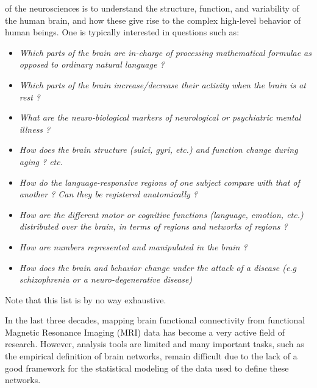  of the neurosciences is to understand the structure, function, and variability of the human brain, and how these give rise to the complex high-level behavior of human beings. One is typically interested in questions such as:

\begin{itemize}
  \item \textit{Which parts of the brain are in-charge of processing mathematical formulae as opposed to ordinary natural language ?}
  \item \textit{Which parts of the brain increase/decrease their activity when the brain is at rest ?}
  \item \textit{What are the neuro-biological markers of neurological or psychiatric mental illness ?}
  \item \textit{How does the brain structure (sulci, gyri, etc.) and function change during aging ? etc.}
 \item \textit{How do the language-responsive regions of one subject compare with that of another ? Can they be registered anatomically ?}
 \item \textit{How are the different motor or cognitive functions (language, emotion, etc.) distributed over the brain, in terms of regions and networks of regions ?}
 \item \textit{How are numbers represented and manipulated in the brain ?}
\item \textit{How does the brain and behavior change under the attack of a disease (e.g schizophrenia or a neuro-degenerative disease)}   
\end{itemize}
Note that this list is by no way exhaustive.

In the last three decades, mapping brain functional connectivity from
functional Magnetic Resonance Imaging (MRI) data has become a very
active field of research. However, analysis tools are limited and many
important tasks, such as the empirical definition of brain networks,
remain difficult due to the lack of a good framework for the
statistical modeling of the data used to define these networks.
%

